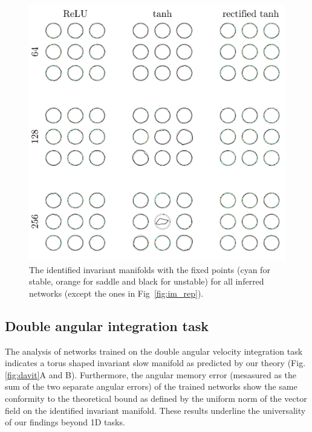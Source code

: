 \documentclass{article} %
\newcounter{ct}
\theoremstyle{definition}
\theoremstyle{remark}
\begin{document}
\newpage
\begin{figure}[tbhp]
     \centering
    \includegraphics[width=\textwidth]{im_all_3x3}
       \caption{The identified invariant manifolds with the fixed points (cyan for stable, orange for saddle and black for unstable) for all inferred networks (except the ones in Fig~\ref{fig:im_rep}).}
       \label{fig:im_all}
\end{figure}



\newpage
\subsection{Double angular integration task}

The analysis of networks trained on the double angular velocity integration task indicates a torus shaped invariant slow manifold as predicted by our theory (Fig.\ref{fig:davit}A and B).
Furthermore, the angular memory error (mesasured as the sum of the two separate angular errors) of the trained networks show the same conformity to the theoretical bound as defined by the uniform norm of the vector field on the identified invariant manifold.
These results underline the universality of our findings beyond 1D tasks.
\end{document}
